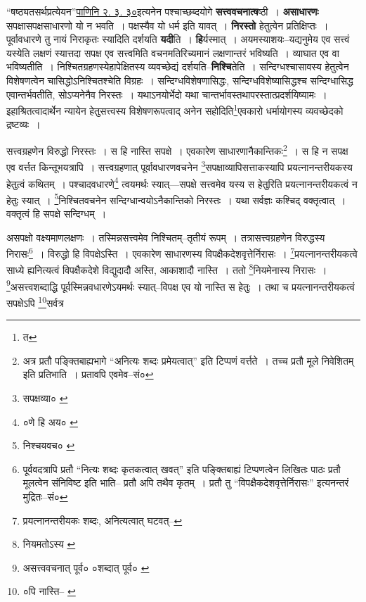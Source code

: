 \documentclass[article,12pt,a4paper]{memoir}
\begin{document}
	  \pstart “षष्ठ्यतसर्थप्रत्येयन”\href{http://http://sarit.indology.info/?cref=Pā.2.3.30}{पाणिनि २. ३. ३०}इत्यनेन पश्चाच्छब्दयोगे \textbf{सत्त्ववचनात्ष}ष्ठी । \textbf{असाधारणः} सपक्षासपक्षसाधारणो यो न भवति । पक्षस्यैव यो धर्म इति यावत् । \textbf{निरस्तो} हेतुत्वेन प्रतिक्षिप्तः । पूर्वावधारणे तु नायं निराकृतः स्यादिति दर्शयति \textbf{यदी}ति । \textbf{हि}र्यस्मात् । अयमस्याशयः--यद्यनुमेय एव सत्त्वं यस्येति लक्षणं स्यात्तदा सपक्ष एव सत्त्वमिति वचनमतिरिच्यमानं लक्षणान्तरं भविष्यति । व्याघात एव वा भविष्यतीति । निश्चितग्रहणस्येहापेक्षितस्य व्यवच्छेद्यं दर्शयति--\textbf{निश्चि}तेति । सन्दिग्धश्चासावस्य हेतुत्वेन विशेषणत्वेन चासिद्धोऽनिश्चितश्चेति विग्रहः । सन्दिग्धविशेषणासिद्धः, सन्दिग्धविशेष्यासिद्धश्च सन्दिग्धासिद्ध एवान्त\leavevmode{}र्भवतीति, सोऽप्यनेनैव निरस्तः । यथाऽनयोर्भेदो यथा चान्तर्भावस्तथापरस्तात्प्रदर्शयिष्यामः । इहाश्रितत्वादार्थेन न्यायेन हेतुसत्त्वस्य विशेषणरूपत्वाद् अनेन सहोदिति\footnote{त}\-एवकारो धर्मायोगस्य व्यवच्छेदको द्रष्टव्यः ।
	\pend
	  \bigskip
	  \begingroup
	

	  \pstart सत्त्वग्रहणेन विरुद्धो निरस्तः । स हि नास्ति सपक्षे । एवकारेण साधारणानैकान्तिकः\footnote{अत्र \cite{dp-msD} प्रतौ पङ्क्तिबाह्यभागे “अनित्यः शब्दः प्रमेयत्वात्” इति टिप्पणं वर्त्तते । तच्च \cite{dp-msB} प्रतौ मूले निवेशितम् इति प्रतिभाति । \cite{dp-edH} \cite{dp-edN} प्रतावपि एवमेव--सं०} । स हि न सपक्ष एव वर्त्तत किन्तूभयत्रापि । सत्त्वग्रहणात् पूर्वावधारणवचनेन \footnote{सपक्षव्या० \cite{dp-msB} \cite{dp-edH}}\-सपक्षाव्यापिसत्ताकस्यापि प्रयत्नानन्तरीयकस्य हेतुत्वं कथितम् । पश्चादवधारणे\footnote{०णे हि अय० \cite{dp-msA} \cite{dp-msC}} त्वयमर्थः स्यात्—सपक्षे सत्त्वमेव यस्य स हेतुरिति प्रयत्नानन्तरीयकत्वं न हेतुः स्यात् । \footnote{निश्चयवच० \cite{dp-msA}}\-निश्चितवचनेन सन्दिग्धान्वयोऽनैकान्तिको निरस्तः । यथा सर्वज्ञः कश्चिद् वक्तृत्वात् । वक्तृत्वं हि सपक्षे सन्दिग्धम् ।
	\pend
       

	  \pstart असपक्षो वक्ष्यमाणलक्षणः । तस्मिन्नसत्त्वमेव निश्चितम्--तृतीयं रूपम् । तत्रासत्त्वग्रहणेन विरुद्धस्य निरासः\footnote{पूर्ववदत्रापि \cite{dp-msD} प्रतौ “नित्यः शब्दः कृतकत्वात् खवत्” इति पङ्क्तिबाह्यं टिप्पणत्वेन लिखितः पाठः \cite{dp-msB} प्रतौ मूलत्वेन संनिविष्ट इति भाति--\cite{dp-edN} प्रतौ अपि तथैव कृतम् । \cite{dp-edH} प्रतौ तु “विपक्षैकदेशवृत्तेर्निरासः” इत्यनन्तरं मुद्रितः--सं०} । विरुद्धो हि विपक्षेऽस्ति । एवकारेण साधारणस्य विपक्षैकदेशवृत्तेर्निरासः । \footnote{प्रयत्नानन्तरीयकः शब्दः, अनित्यत्वात् घटवत्--\cite{dp-msD-n}}\-प्रयत्नानन्तरीयकत्वे साध्ये ह्यनित्यत्वं विपक्षैकदेशे विद्युदादौ अस्ति, आकाशादौ नास्ति । ततो \footnote{नियमतोऽस्य \cite{dp-msC}}\-नियमेनास्य निरासः । \footnote{असत्त्ववचनात् पूर्व० \cite{dp-msA} \cite{dp-edP} \cite{dp-edH} \cite{dp-edE} \cite{dp-edN} ०शब्दात् पूर्व० \cite{dp-msB} \cite{dp-msC} \cite{dp-msD}}\-असत्त्वशब्दाद्धि पूर्वस्मिन्नवधारणेऽयमर्थः स्यात्--विपक्ष एव यो नास्ति स हेतुः । तथा च प्रयत्नानन्तरीयकत्वं सपक्षेऽपि \footnote{०पि नास्ति--\cite{dp-msB} \cite{dp-edE}}\-सर्वत्र
	\pend
      
\end{document}
